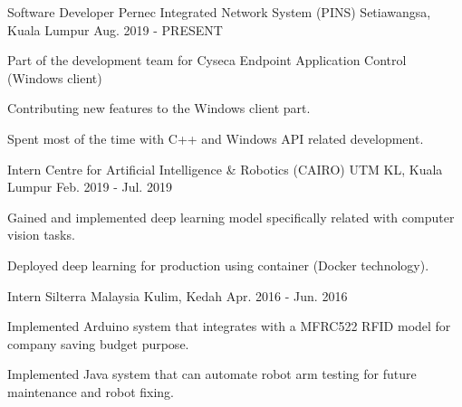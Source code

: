 

\begin{cventries}


\cventry
  {Software Developer}
  {Pernec Integrated Network System (PINS)}
  {Setiawangsa, Kuala Lumpur}
  {Aug. 2019 - PRESENT}
  {
    \begin{cvitems}
      \item {Part of the development team for Cyseca Endpoint Application Control (Windows client)}
      \item {Contributing new features to the Windows client part.}
      \item {Spent most of the time with C++ and Windows API related development.}
    \end{cvitems}
  }

\cventry
  {Intern}
  {Centre for Artificial Intelligence \& Robotics (CAIRO)}
  {UTM KL, Kuala Lumpur}
  {Feb. 2019 - Jul. 2019}
  {
    \begin{cvitems}
      \item {Gained and implemented deep learning model specifically related with computer vision tasks.}
      \item {Deployed deep learning for production using container (Docker technology).}
    \end{cvitems}
  }

\cventry
  {Intern}
  {Silterra Malaysia}
  {Kulim, Kedah}
  {Apr. 2016 - Jun. 2016}
  {
    \begin{cvitems}
      \item {Implemented Arduino system that integrates with a MFRC522 RFID model for company saving budget purpose.}
      \item {Implemented Java system that can automate robot arm testing for future maintenance and robot fixing.}
    \end{cvitems}
  }

\end{cventries}
